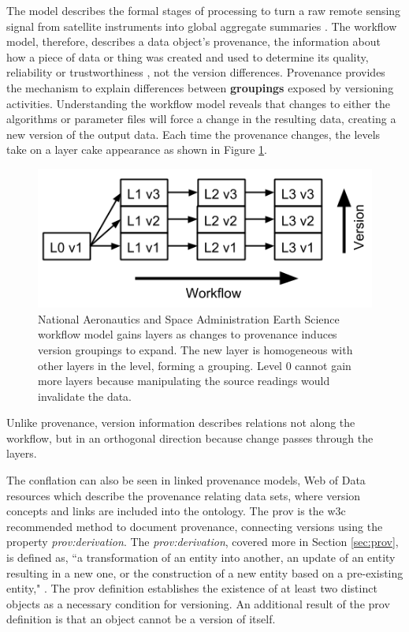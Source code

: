 The model describes the formal stages of processing to turn a raw remote sensing signal from satellite instruments into global aggregate summaries \cite{Barkstrom2003}.
The workflow model, therefore, describes a data object's \gls{provenance}, the information about how a piece of data or thing was created and used to determine its quality, reliability or trustworthiness \cite{Moreau2013c}, not the version differences.
Provenance provides the mechanism to explain differences between \textbf{groupings} exposed by versioning activities.
Understanding the workflow model reveals that changes to either the algorithms or parameter files will force a change in the resulting data, creating a new version of the output data.
Each time the provenance changes, the levels take on a layer cake appearance as shown in Figure \ref{NASALayers}. 
\begin{figure}
	\centering
	\includegraphics[scale=1]{figures/VersionLayerDiagram2.png}
	\caption[Versions Layered on the National Aeronautics and Space Administration Earth Science workflow model]{National Aeronautics and Space Administration Earth Science workflow model gains layers as changes to provenance induces version groupings to expand.  The new layer is homogeneous with other layers in the level, forming a grouping.  Level 0 cannot gain more layers because manipulating the source readings would invalidate the data.}
	\label{NASALayers}
\end{figure}
Unlike provenance, version information describes relations not along the workflow, but in an orthogonal direction because change passes through the layers.

The conflation can also be seen in \gls{linked} provenance models, Web of Data resources which describe the \gls{provenance} relating data sets, where version concepts and links are included into the ontology.
The \gls{prov} is the \gls{w3c} recommended method to document \gls{provenance}, connecting versions using the property \textit{prov:derivation}.
The \textit{prov:derivation}, covered more in Section \ref{sec:prov}, is defined as, ``a transformation of an entity into another, an update of an entity resulting in a new one, or the construction of a new entity based on a pre-existing entity," \cite{Lebo2013}.
The \gls{prov} definition establishes the existence of at least two distinct objects as a necessary condition for versioning.
An additional result of the \gls{prov} definition is that an object cannot be a version of itself.


